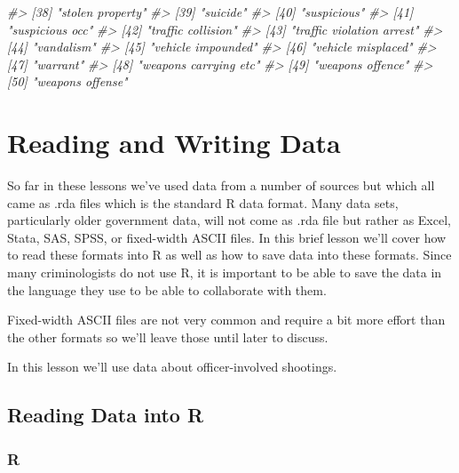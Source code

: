 \documentclass[
  12pt,
]{book}
\newenvironment{Shaded}{\begin{snugshade}}{\end{snugshade}}
\newcommand{\CommentTok}[1]{\textcolor[rgb]{0.56,0.35,0.01}{\textit{#1}}}
\begin{document}
\begin{Shaded}
\begin{Highlighting}[]
\CommentTok{\#> [38] "stolen property"                           }
\CommentTok{\#> [39] "suicide"                                   }
\CommentTok{\#> [40] "suspicious"                                }
\CommentTok{\#> [41] "suspicious occ"                            }
\CommentTok{\#> [42] "traffic collision"                         }
\CommentTok{\#> [43] "traffic violation arrest"                  }
\CommentTok{\#> [44] "vandalism"                                 }
\CommentTok{\#> [45] "vehicle impounded"                         }
\CommentTok{\#> [46] "vehicle misplaced"                         }
\CommentTok{\#> [47] "warrant"                                   }
\CommentTok{\#> [48] "weapons carrying etc"                      }
\CommentTok{\#> [49] "weapons offence"                           }
\CommentTok{\#> [50] "weapons offense"}
\end{Highlighting}
\end{Shaded}

\hypertarget{reading-and-writing-data}{%
\chapter{Reading and Writing Data}\label{reading-and-writing-data}}

So far in these lessons we've used data from a number of sources but which all came as .rda files which is the standard R data format. Many data sets, particularly older government data, will not come as .rda file but rather as Excel, Stata, SAS, SPSS, or fixed-width ASCII files. In this brief lesson we'll cover how to read these formats into R as well as how to save data into these formats. Since many criminologists do not use R, it is important to be able to save the data in the language they use to be able to collaborate with them.

Fixed-width ASCII files are not very common and require a bit more effort than the other formats so we'll leave those until later to discuss.

In this lesson we'll use data about officer-involved shootings.

\hypertarget{reading-data-into-r}{%
\section{Reading Data into R}\label{reading-data-into-r}}

\hypertarget{r}{%
\subsection{R}\label{r}}
\end{document}
